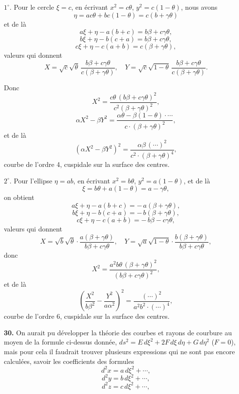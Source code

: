 \documentclass[11pt,a4paper]{article}
\begin{document}
$1^\circ$. Pour le cercle $\xi = c$, en \'ecrivant $x^2 = c\theta$, $y^2 = c(1 - \theta)$, nous avons
\[
\eta = a c\theta + b c (1 - \theta) = c(b + \gamma\theta)
\]
et de l\`a
\[
a\xi + \eta - a(b + c) = b\beta + c\gamma\theta,
\]
\[
b\xi + \eta - b(c + a) = b\beta + c\gamma\theta,
\]
\[
c\xi + \eta - c(a + b) = c(\beta + \gamma\theta),
\]
valeurs qui donnent
\[
X = \sqrt{c}\sqrt{\theta}\,\frac{b\beta + c\gamma\theta}{c(\beta + \gamma\theta)},\quad Y = \sqrt{c}\sqrt{1 - \theta}\,\frac{b\beta + c\gamma\theta}{c(\beta + \gamma\theta)}.
\]

Donc
\[
X^2 = \frac{c\theta\,(b\beta + c\gamma\theta)^2}{c^2(\beta + \gamma\theta)^2},
\]
\[
\alpha X^2 - \beta Y^2 = \frac{\alpha\theta - \beta(1 - \theta)\cdot\cdots}{c\cdot(\beta + \gamma\theta)^2},
\]
et de l\`a
\[
(\alpha X^2 - \beta Y^2)^2 = \frac{\alpha\beta\,(\cdots)^2}{c^2 \cdot (\beta + \gamma\theta)^4},
\]
courbe de l'ordre 4, cuspidale sur la surface des centres.

$2^\circ$. Pour l'ellipse $\eta = ab$, en \'ecrivant $x^2 = b\theta$, $y^2 = a(1 - \theta)$, et de l\`a
\[
\xi = b\theta + a(1 - \theta) = a - \gamma\theta,
\]
on obtient
\[
a\xi + \eta - a(b + c) = -\,a(\beta + \gamma\theta),
\]
\[
b\xi + \eta - b(c + a) = -\,b(\beta + \gamma\theta),
\]
\[
c\xi + \eta - c(a + b) = -\,b\beta - c\gamma\theta,
\]
valeurs qui donnent
\[
X = \sqrt{b}\sqrt{\theta}\cdot\frac{a(\beta + \gamma\theta)}{b\beta + c\gamma\theta},\quad Y = \sqrt{a}\sqrt{1 - \theta}\cdot\frac{b(\beta + \gamma\theta)}{b\beta + c\gamma\theta},
\]
donc
\[
X^2 = \frac{a^2 b\theta\,(\beta + \gamma\theta)^2}{(b\beta + c\gamma\theta)^2},
\]
et de l\`a
\[
\left(\frac{X^2}{b\beta^2} - \frac{Y^2}{a\alpha^2}\right)^2 = \frac{(\cdots)^2}{a^2 b^2 \cdot (\cdots)^4},
\]
courbe de l'ordre 6, cuspidale sur la surface des centres.

\textbf{30.} On aurait pu d\'evelopper la th\'eorie des courbes et rayons de courbure au moyen de la formule ci-dessus donn\'ee, $ds^2 = E\,d\xi^2 + 2 F\,d\xi\,d\eta + G\,d\eta^2$ ($F = 0$), mais pour cela il faudrait trouver plusieurs expressions qui ne sont pas encore calcul\'ees, savoir les coefficients des formules
\[
d^2 x = a\,d\xi^2 + \cdots,
\]
\[
d^2 y = b\,d\xi^2 + \cdots,
\]
\[
d^2 z = c\,d\xi^2 + \cdots,
\]
\end{document}
